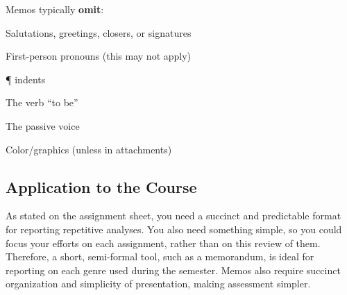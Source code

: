 \documentclass[10pt, oneside]{texMemo}	%
\begin{document}
\noindent Memos typically \textbf{omit}:
\begin{multicols}{2}
	\begin{itemize*}
		\item Salutations, greetings, closers, or signatures
		\item First-person pronouns (this may not apply)
		\item ¶ indents
		\item The verb ``to be''
		\item The passive voice
		\item Color/graphics (unless in attachments)
	\end{itemize*}
\end{multicols}

\subsection*{Application to the Course} %
\label{sec:procedure}
As stated on the assignment sheet, you need a succinct and predictable format for reporting repetitive analyses. You also need something simple, so you could focus your efforts on each assignment, rather than on this review of them. Therefore, a short, semi-formal tool, such as a memorandum, is ideal for reporting on each genre used during the semester. Memos also require succinct organization and simplicity of presentation, making assessment simpler.
\end{document}
